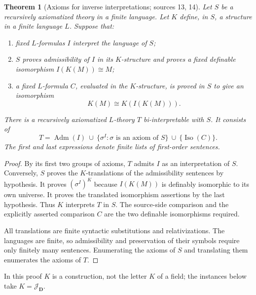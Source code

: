 \documentclass[11pt,letterpaper]{article}
\newtheorem{theorem}{Theorem}[section]
\theoremstyle{definition}
\theoremstyle{remark}
\newcommand{\J}{\mathcal J}
\newcommand{\Dd}{\mathbf{D}}
\begin{document}
\begin{theorem}[Axioms for inverse interpretations; sources 13, 14]\label{hset:sf:thm:axiomprinciple}
Let $S$ be a recursively axiomatized theory in a finite language. Let $K$ define,
in $S$, a structure in a finite language $L$. Suppose that:
\begin{enumerate}[label=(\roman*)]
\item fixed $L$-formulas $I$ interpret the language of $S$;
\item $S$ proves admissibility of $I$ in its $K$-structure and proves a fixed
definable isomorphism $I(K(M))\cong M$;
\item a fixed $L$-formula $C$, evaluated in the $K$-structure, is proved in $S$ to
give an isomorphism
\[
 K(M)\cong K(I(K(M))).
\]
\end{enumerate}
There is a recursively axiomatized $L$-theory $T$ bi-interpretable with $S$. It
consists of
\begin{equation}\label{hset:sf:eq:axioms}
 \boxed{\;T=\operatorname{Adm}(I)\ \cup\ \{\sigma^I:\sigma\text{ is an axiom of }S\}\ \cup\
 \{\operatorname{Iso}(C)\}.\;}
\end{equation}
The first and last expressions denote finite lists of first-order sentences.
\end{theorem}
\begin{proof}
By its first two groups of axioms, $T$ admits $I$ as an interpretation of $S$.
Conversely, $S$ proves the $K$-translations of the admissibility sentences by
hypothesis. It proves $(\sigma^I)^K$ because $I(K(M))$ is definably isomorphic to
its own universe. It proves the translated isomorphism assertions by the last
hypothesis. Thus $K$ interprets $T$ in $S$. The source-side comparison and the
explicitly asserted comparison $C$ are the two definable isomorphisms required.

All translations are finite syntactic substitutions and relativizations. The
languages are finite, so admissibility and preservation of their symbols require
only finitely many sentences. Enumerating the axioms of $S$ and translating them
enumerates the axioms of $T$.
\end{proof}

In this proof $K$ is a construction, not the letter $K$ of a field; the instances
below take $K=\J_{\Dd}$.
\end{document}
